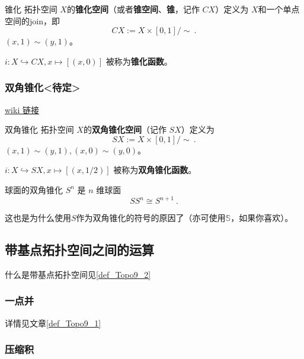 \begin{definition}{锥化}
拓扑空间 $X$的\textbf{锥化空间}（或者\textbf{锥空间}、\textbf{锥}，记作 $C X$）定义为 $X$和一个单点空间的join，即
\[
    C X := X \times [0,1] / \sim~.
\]
$(x, 1) \sim (y, 1)$。

$i: X \hookrightarrow C X, x \mapsto [(x, 0)]$ 被称为\textbf{锥化函数}。
\end{definition}


\subsubsection{双角锥化<待定>}

\href{https://en.wikipedia.org/wiki/Suspension_(topology)}{wiki 链接}

\begin{definition}{双角锥化}
拓扑空间 $X$的\textbf{双角锥化空间}（记作 $S X$）定义为
\[
    S X := X \times [0,1] / \sim~.
\]
$(x, 1) \sim (y, 1), (x, 0) \sim (y, 0)$。

$i: X \hookrightarrow S X, x \mapsto [(x, 1/2)]$ 被称为\textbf{双角锥化函数}。
\end{definition}

\begin{theorem}{球面的双角锥化}
$S^n$ 是 $n$ 维球面
\[
S S^n \cong S^{n+1}~.
\]
\end{theorem}
这也是为什么使用$S$作为双角锥化的符号的原因了（亦可使用$\mathbb{S}$，如果你喜欢）。


\subsection{带基点拓扑空间之间的运算}

什么是带基点拓扑空间见\autoref{def_Topo9_2} 

\subsubsection{一点并}

详情见文章\autoref{def_Topo9_1} 


\subsubsection{压缩积}

